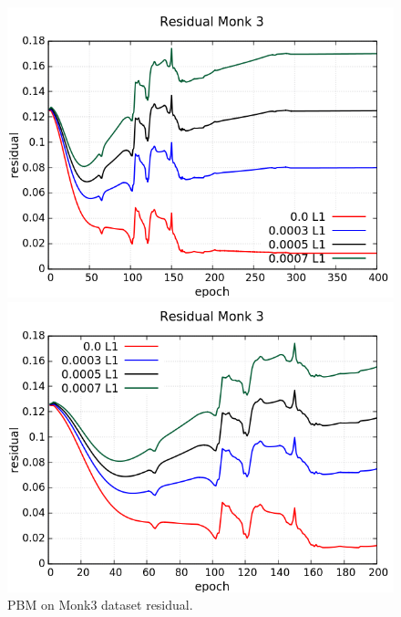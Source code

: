 \begin{figure}[H]
	\centering
	\begin{minipage}[t]{0.5\linewidth}
		\includegraphics[width=\linewidth]{data/PBM/Monk3/Monk3_PBM_Residual_standard.png}
	\end{minipage}%
	\begin{minipage}[t]{0.5\linewidth}
		\includegraphics[width=\linewidth]{data/PBM/Monk3/Monk3_PBM_Residual_zoom.png}
	\end{minipage}
	\caption{PBM on Monk3 dataset residual.}
\end{figure}
